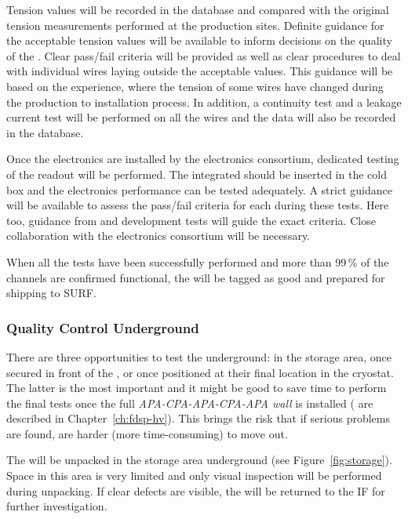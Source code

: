 Tension values will be recorded in the database and compared with the original tension measurements performed at the production sites. Definite guidance for the acceptable tension values will be available to inform decisions on the quality of the . Clear pass/fail criteria %
will be provided as well as clear procedures to deal with individual wires laying outside the acceptable values. %
This guidance will be based on the  experience, where the tension of some wires have changed during the production to installation process. In addition, a continuity test and a leakage current test will be performed on all the wires and the data will also be recorded in the database. 

Once the electronics are installed by the electronics consortium, dedicated testing of the  readout will be performed. The integrated  should be inserted in the cold box and the electronics performance can be tested adequately. A strict guidance will be available to assess the pass/fail criteria for each  during these tests. Here too, guidance from  and development tests will guide the exact criteria. Close collaboration with the electronics consortium will be necessary.

When all the tests have been successfully performed and more than \num{99}\,\% of the channels are confirmed functional, the  will be tagged as good and prepared for shipping to SURF.

\subsubsection{Quality Control Underground}
\label{sec:fdsp-apa-install-qc_underground}

There are three opportunities to test the  underground: in the storage area, once secured in front of the , or once positioned at their final location in the cryostat. The latter is the most important and it might be good to save time to perform the final tests once the full \textit{APA-CPA-APA-CPA-APA wall} is installed ( are described in Chapter~\ref{ch:fdsp-hv}). This brings the risk that if serious problems are found,  are harder (more time-consuming) to move out.

The  will be unpacked in the storage area underground (see Figure~\ref{fig:storage}). Space in this area is very limited and only visual inspection will be performed during unpacking. If clear defects are visible, the  will be returned to the IF for further investigation.

